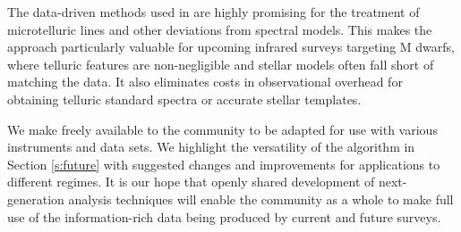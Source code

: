 \documentclass[modern]{aastex62}
\begin{document}
The data-driven methods used in \wobble are highly promising for the treatment of microtelluric lines and other deviations from spectral models.
This makes the approach particularly valuable for upcoming infrared surveys targeting M dwarfs, where telluric features are non-negligible and stellar models often fall short of matching the data.
It also eliminates costs in observational overhead for obtaining telluric standard spectra or accurate stellar templates.

We make \wobble freely available to the \RV community to be adapted for use with various instruments and data sets.
We highlight the versatility of the algorithm in Section \ref{s:future} with suggested changes and improvements for applications to different regimes.
It is our hope that openly shared development of next-generation \RV analysis techniques will enable the community as a whole to make full use of the information-rich data being produced by current and future \EPRV surveys.




\end{document}
